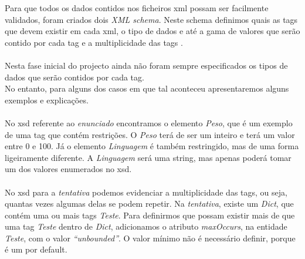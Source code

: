 Para que todos os dados contidos nos ficheiros xml possam ser facilmente validados, foram criados dois \textit{XML schema}.
Neste schema definimos quais as tags que devem existir em cada xml, o tipo de dados e até a gama de valores que serão contido por cada tag e
 a multiplicidade das tags .\\
\\
Nesta fase inicial do projecto ainda não foram sempre especificados  os tipos de dados que serão contidos por cada tag.\\
No entanto, para alguns dos casos em que tal aconteceu apresentaremos alguns exemplos e explicações.\\
\\
No xsd referente ao \textit{enunciado} encontramos o elemento \textit{Peso}, que é um exemplo de uma tag que contém restrições.
O \textit{Peso} terá de ser um inteiro e terá um valor entre 0 e 100.
Já o elemento \textit{Linguagem} é também restringido, mas de uma forma ligeiramente diferente. A \textit{Linguagem} será uma string, mas
apenas poderá tomar um dos valores enumerados no xsd.\\
\\
%

No xsd para a \textit{tentativa} podemos evidenciar a multiplicidade das tags, ou seja, quantas vezes algumas delas se podem repetir.
Na \textit{tentativa}, existe um \textit{Dict}, que contém uma ou mais tags \textit{Teste}.
Para definirmos que possam existir mais de que uma tag \textit{Teste} dentro de \textit{Dict}, adicionamos o atributo \textit{maxOccurs},
na entidade \textit{Teste}, com o valor \textit{``unbounded''}. O valor mínimo não é necessário definir, porque é um por default.


%

